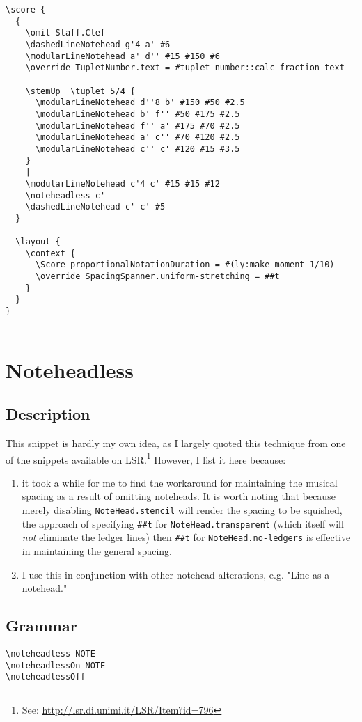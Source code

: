 \documentclass[11pt, oneside]{book}   	%
\begin{document}
\begin{verbatim}
\score {
  {
    \omit Staff.Clef
    \dashedLineNotehead g'4 a' #6
    \modularLineNotehead a' d'' #15 #150 #6
    \override TupletNumber.text = #tuplet-number::calc-fraction-text

    \stemUp  \tuplet 5/4 {
      \modularLineNotehead d''8 b' #150 #50 #2.5
      \modularLineNotehead b' f'' #50 #175 #2.5
      \modularLineNotehead f'' a' #175 #70 #2.5
      \modularLineNotehead a' c'' #70 #120 #2.5
      \modularLineNotehead c'' c' #120 #15 #3.5
    }
    |
    \modularLineNotehead c'4 c' #15 #15 #12
    \noteheadless c'
    \dashedLineNotehead c' c' #5
  }

  \layout {
    \context {
      \Score proportionalNotationDuration = #(ly:make-moment 1/10)    
      \override SpacingSpanner.uniform-stretching = ##t
    }
  }
}


\end{verbatim}
\vfill \break




\section {Noteheadless}
\hfill

\subsection{Description}
This snippet is hardly my own idea, as I largely quoted this technique from one of the snippets available on LSR.\footnote{See: \url{http://lsr.di.unimi.it/LSR/Item?id=796}} However, I list it here because: 
\begin{enumerate} 
\item it took a while for me to find the workaround for maintaining the musical spacing as a result of omitting noteheads. It is worth noting that because merely disabling \verb|NoteHead.stencil| will render the spacing to be squished, the approach of specifying \verb|##t| for \verb|NoteHead.transparent| (which itself will \textit{not} eliminate the ledger lines) then \verb|##t| for \verb|NoteHead.no-ledgers| is effective in maintaining the general spacing.
\item I use this in conjunction with other notehead alterations, e.g. "Line as a notehead." 
\end{enumerate}

\subsection{Grammar}
\begin{verbatim}
\noteheadless NOTE
\noteheadlessOn NOTE 
\noteheadlessOff
\end{verbatim}
\end{document}
